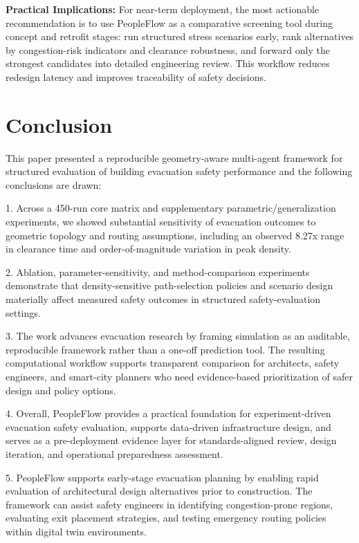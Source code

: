 \documentclass[utf8]{FrontiersinHarvard}
\begin{document}
\noindent\textbf{Practical Implications:} For near-term deployment, the most actionable recommendation is to use PeopleFlow as a comparative screening tool during concept and retrofit stages: run structured stress scenarios early, rank alternatives by congestion-risk indicators and clearance robustness, and forward only the strongest candidates into detailed engineering review. This workflow reduces redesign latency and improves traceability of safety decisions.

\section{Conclusion}
This paper presented a reproducible geometry-aware multi-agent framework for structured evaluation of building evacuation safety performance and the following conclusions are drawn: 

1. Across a 450-run core matrix and supplementary parametric/generalization experiments, we showed substantial sensitivity of evacuation outcomes to geometric topology and routing assumptions, including an observed 8.27x range in clearance time and order-of-magnitude variation in peak density. 

2. Ablation, parameter-sensitivity, and method-comparison experiments demonstrate that density-sensitive path-selection policies and scenario design materially affect measured safety outcomes in structured safety-evaluation settings.

3. The work advances evacuation research by framing simulation as an auditable, reproducible framework rather than a one-off prediction tool. The resulting computational workflow supports transparent comparison for architects, safety engineers, and smart-city planners who need evidence-based prioritization of safer design and policy options. 

4. Overall, PeopleFlow provides a practical foundation for experiment-driven evacuation safety evaluation, supports data-driven infrastructure design, and serves as a pre-deployment evidence layer for standards-aligned review, design iteration, and operational preparedness assessment.

5. PeopleFlow supports early-stage evacuation planning by enabling rapid evaluation of architectural design alternatives prior to construction. The framework can assist safety engineers in identifying congestion-prone regions, evaluating exit placement strategies, and testing emergency routing policies within digital twin environments. 
\end{document}
